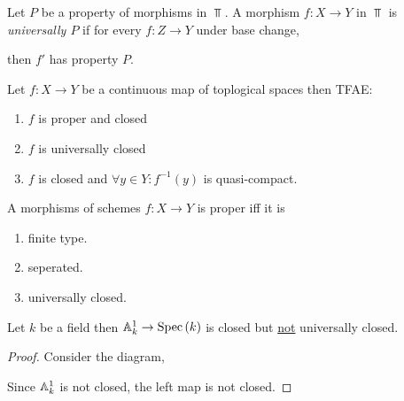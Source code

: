 \documentclass[12pt]{article}
\begin{document}
\begin{definition}
Let $P$ be a property of morphisms in $\Top$. A morphism $f : X \to Y$ in $\Top$ is \textit{universally $P$} if for every $f : Z \to Y$ under base change,
\begin{center}
\end{center} 
then $f'$ has property $P$.
\end{definition}

\begin{theorem}
Let $f : X \to Y$ be a continuous map of toplogical spaces then TFAE:
\begin{enumerate}
\item $f$ is proper and closed
\item $f$ is universally closed
\item $f$ is closed and $\forall y \in Y : f^{-1}(y)$ is quasi-compact. 
\end{enumerate}
\end{theorem}



\begin{definition}
A morphisms of schemes $f : X \to Y$ is proper iff it is
\begin{enumerate}
\item finite type.
\item seperated.
\item universally closed.
\end{enumerate}
\end{definition}

\begin{example}
Let $k$ be a field then $\mathbb{A}^1_k \to \mathrm{Spec}\left( k \right)$ is closed but \underline{not} universally closed. 
\end{example}

\begin{proof}
Consider the diagram,
\begin{center}
\end{center}
Since $\mathbb{A}^1_k$ is not closed, the left map is not closed. 
\end{proof} 
\end{document}
